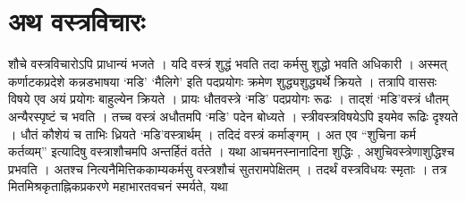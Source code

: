 {\section*{अथ वस्त्रविचारः}

शौचे वस्त्रविचारोऽपि प्राधान्यं भजते । यदि वस्त्रं शुद्धं भवति तदा कर्मसु शुद्धो भवति अधिकारी । अस्मत् कर्णाटकप्रदेशे कन्नडभाषया ‘मडि’ ‘मैलिगे’ इति पदप्रयोगः क्रमेण शुद्ध्यशुद्ध्यर्थे क्रियते । तत्रापि वाससः विषये एव अयं प्रयोगः बाहुल्येन क्रियते । प्रायः धौतवस्त्रे ‘मडि’ पदप्रयोगः रूढः । ताद्शं ‘मडि’वस्त्रं धौतम् अन्यैरस्पृष्टं च भवति । तच्च वस्त्रं अधौतमपि ‘मडि’ पदेन बोध्यते । स्त्रीवस्त्रविषयेऽपि इयमेव रूढिः दृश्यते । धौतं कौशेयं च ताभिः ध्रियते ‘मडि’वस्त्रार्थम् । तदिदं वस्त्रं कर्माङ्गम् । अत एव “शुचिना कर्म कर्तव्यम्” इत्यादिषु वस्त्राशौचमपि अन्तर्हितं वर्तते । यथा आचमनस्नानादिना शुद्धिः , अशुचिवस्त्रेणाशुद्धिश्च प्रभवति । अतश्च नित्यनैमित्तिककाम्यकर्मसु वस्त्रशौचं सुतरामपेक्षितम् । तदर्थं वस्त्रविधयः स्मृताः । तत्र मितमिश्रकृताह्निकप्रकरणे महाभारतवचनं स्मर्यते, यथा

}
